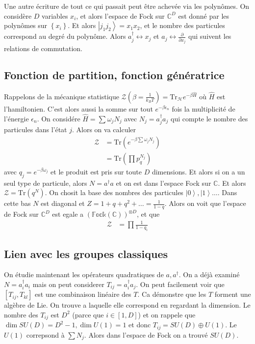 \documentclass[10pt]{report}
\newcommand{\ket}[1]{\left|#1\right>}
\newcommand{\pd}[2]{\frac{\partial #1}{\partial#2}}
\begin{document}
Une autre \'ecriture de tout ce qui passait peut \^etre achev\'ee via les polyn\^omes. On consid\`ere $D$ variables $x_i$, et alors l'espace de Fock sur $\mathbb{C}^D$ est donn\'e par les polyn\^omes sur $\left\{ x_i \right\}$. Et alors $\ket{j_1j_2} = x_1x_2$, et le nombre des particules correspond au degr\'e du polyn\^ome. Alors $a_j^\dagger \leftrightarrow x_j$ et $a_j \leftrightarrow \pd{}{x_j}$ qui suivent les relations de commutation. 

\subsection{Fonction de partition, fonction g\'en\'eratrice}

Rappelons de la m\'ecanique statistique $\mathcal{Z}\left( \beta = \frac{1}{k_BT} \right) = \mathrm{Tr}_{\mathcal{H}}e^{-\beta \hat{H}}$ o\`u $\hat{H}$ est l'hamiltonien. C'est alors aussi la somme sur tout $e^{-\beta\epsilon_n}$ fois la multiplicit\'e de l'\'energie $\epsilon_n$. On consid\'ere $\hat{H} = \sum\limits_{}^{}\omega_j N_j$ avec $N_j = a_j^\dagger a_j$ qui compte le nombre des particules dans l'\'etat $j$. Alors on va calculer
\begin{align}
    \mathcal{Z} &= \mathrm{Tr} \left( e^{-\beta \sum\limits_{}^{}\omega_j N_j} \right)\\
    &= \mathrm{Tr} \left( \prod p_q^{N_j} \right)
\end{align}
avec $q_j = e^{-\beta \omega_j}$ et le produit est pris sur toute $D$ dimensions. Et alors si on a un seul type de particule, alors $N = a^\dagger a$ et on est dans l'espace Fock sur $\mathbb{C}$. Et alors $\mathcal{Z} = \mathrm{Tr}(q^N)$. On chosit la base des nombres des particules $\ket{0}, \ket{1}\dots$. Dans cette bas $N$ est diagonal et $Z = 1 + q + q^2 +\dots = \frac{1}{1-q}$. Alors on voit que l'espace de Fock sur $\mathbb{C}^D$ est egale a $(\mathbb{Fock}(\mathbb{C}))^{\otimes D}$, et que
\begin{align}
    \mathcal{Z} &= \prod \frac{1}{1 - q_i}
\end{align}

\subsection{Lien avec les groupes classiques}

On \'etudie maintenant les op\'erateurs quadratiques de $a, a^\dagger$. On a d\'ej\`a examin\'e $N = a_i^\dagger a_i$ mais on peut considerer $T_{ij} = a_i^\dagger a_j$. On peut facilement voir que $\left[T_{ij}, T_{kl}\right]$ est une combinaison lin\'eaire des $T$. Ca d\'emonstre que les $T$ forment une alg\`ebre de Lie. On trouve a laquelle elle correspond en regardant la dimension. Le nombre des $T_{ij}$ est $D^2$ (parce que $i \in [1,D]$) et on rappele que $\dim SU(D) = D^2 - 1, \dim U(1) = 1$ et donc $T_{ij} = SU(D) \oplus U(1)$. Le $U(1)$ correpsond \`a $\sum N_j$. Alors dans l'espace de Fock on a trouv\'e $SU(D)$. 
\end{document}

